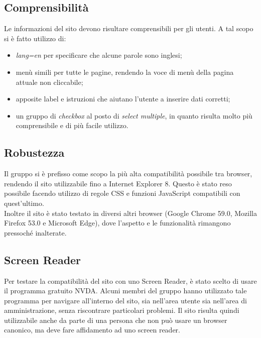 \subsection{Comprensibilità}
Le informazioni del sito devono risultare comprensibili per gli utenti. A tal scopo si è fatto utilizzo di:
	\begin{itemize}
		\item \textit{lang=en} per specificare che alcune parole sono inglesi;
		\item menù simili per tutte le pagine, rendendo la voce di menù della pagina attuale non cliccabile;
		\item apposite label e istruzioni che aiutano l'utente a inserire dati corretti;
		\item un gruppo di \textit{checkbox} al posto di \textit{select multiple}, in quanto risulta molto più comprensibile e di più facile utilizzo.
	\end{itemize}
\subsection{Robustezza}
Il gruppo si è prefisso come scopo la più alta compatibilità possibile tra browser, rendendo il sito utilizzabile fino a Internet Explorer 8. Questo è stato reso possibile facendo utilizzo di regole CSS e funzioni JavaScript compatibili
con quest'ultimo. \\
Inoltre il sito è stato testato in diversi altri browser (Google Chrome 59.0, Mozilla Firefox 53.0 e Microsoft Edge), dove l'aspetto e le funzionalità rimangono pressoché inalterate.

\subsection{Screen Reader}
Per testare la compatibilità del sito con uno Screen Reader, è stato scelto di usare il programma gratuito NVDA. Alcuni membri del gruppo hanno utilizzato tale programma per navigare all’interno del sito, sia nell’area utente sia nell’area di amministrazione, senza riscontrare particolari problemi. Il sito risulta quindi utilizzabile anche da parte di una persona che non può usare un browser canonico, ma deve fare affidamento ad uno screen reader.